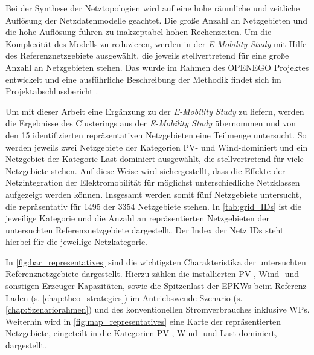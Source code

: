 

Bei der Synthese der Netztopologien wird auf eine hohe räumliche und zeitliche Auflösung der Netzdatenmodelle geachtet.
Die große Anzahl an Netzgebieten und die hohe Auflösung führen zu inakzeptabel hohen Rechenzeiten.
Um die Komplexität des Modells zu reduzieren, werden in der \textit{E-Mobility Study} \cite{Schachler} mit Hilfe des \mbox{\kmeans} Referenznetzgebiete ausgewählt, die jeweils stellvertretend für eine große Anzahl an Netzgebieten stehen.
Das \mbox{\kmean} wurde im Rahmen des \gls{OPENEGO} Projektes entwickelt und eine ausführliche Beschreibung der Methodik findet sich im Projektabschlussbericht \cite{Mueller2019}.\medskip

Um mit dieser Arbeit eine Ergänzung zu der \textit{E-Mobility Study} \cite{Schachler} zu liefern, werden die Ergebnisse des Clusterings aus der \textit{E-Mobility Study} übernommen und von den \num{15} identifizierten repräsentativen Netzgebieten eine Teilmenge untersucht.
So werden jeweils zwei Netzgebiete der Kategorien \gls{PV}- und Wind-dominiert und ein Netzgebiet der Kategorie Last-dominiert ausgewählt, die stellvertretend für viele Netzgebiete stehen.
Auf diese Weise wird sichergestellt, dass die Effekte der Netzintegration der Elektromobilität für möglichst unterschiedliche Netzklassen aufgezeigt werden können.
Insgesamt werden somit fünf Netzgebiete untersucht, die repräsentativ für \num{1495} der \num{3354} Netzgebiete stehen.
In \autoref{tab:grid_IDs} ist die jeweilige Kategorie und die Anzahl an repräsentierten Netzgebieten der untersuchten Referenznetzgebiete dargestellt.
Der Index der Netz \glspl{ID} steht hierbei für die jeweilige Netzkategorie.



In \autoref{fig:bar_representatives} sind die wichtigsten Charakteristika der untersuchten Referenznetzgebiete dargestellt.
Hierzu zählen die installierten \gls{PV}-, Wind- und sonstigen Erzeuger-Kapazitäten, sowie die Spitzenlast der \glspl{EPKW} beim Referenz-Laden (s. \autoref{chap:theo_strategies}) im Antriebswende-Szenario (s. \autoref{chap:Szenariorahmen}) und des konventionellen Stromverbrauches inklusive \glspl{WP}.
Weiterhin wird in \autoref{fig:map_representatives} eine Karte der repräsentierten Netzgebiete, eingeteilt in die Kategorien \gls{PV}-, Wind- und Last-dominiert, dargestellt.






